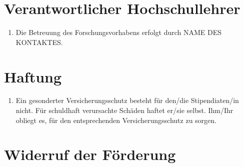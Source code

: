 \documentclass[
  paper=a4,
  fontsize=12pt,
  DIV=16,
  parskip=full,
  headinclude=true,
]{scrartcl}
\newcommand\stipbetreuung{NAME DES KONTAKTES}	%
\begin{document}
\section{Verantwortlicher Hochschullehrer}

\begin{enumerate}[\qquad(1)]
	\item Die Betreuung des Forschungsvorhabens erfolgt durch \stipbetreuung.
\end{enumerate}

\section{Haftung}

\begin{enumerate}[\qquad(1)]
	\item Ein gesonderter Versicherungsschutz besteht für den/die
		Stipendiaten/in nicht.
		Für schuldhaft verursachte Schäden haftet er/sie selbst.
		Ihm/Ihr obliegt es, für den entsprechenden Versicherungsschutz
		zu sorgen. 
\end{enumerate}

\section{Widerruf der Förderung}
\end{document}
